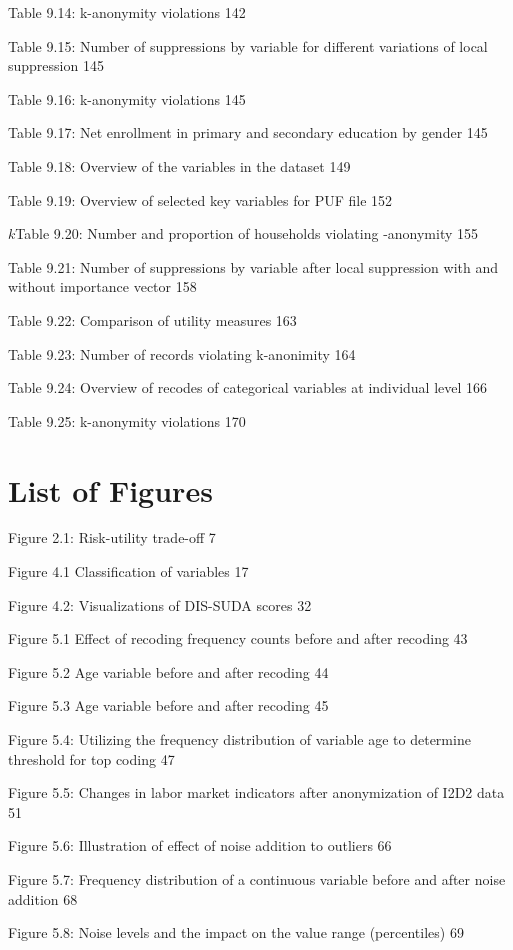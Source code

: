 \documentclass[letterpaper,10pt,english]{sphinxmanual}
\begin{document}
Table 9.14: k-anonymity violations 142

Table 9.15: Number of suppressions by variable for different variations
of local suppression 145

Table 9.16: k-anonymity violations 145

Table 9.17: Net enrollment in primary and secondary education by gender
145

Table 9.18: Overview of the variables in the dataset 149

Table 9.19: Overview of selected key variables for PUF file 152

\(k\)Table 9.20: Number and proportion of households violating
-anonymity 155

Table 9.21: Number of suppressions by variable after local suppression
with and without importance vector 158

Table 9.22: Comparison of utility measures 163

Table 9.23: Number of records violating k-anonimity 164

Table 9.24: Overview of recodes of categorical variables at individual
level 166

Table 9.25: k-anonymity violations 170


\section{List of Figures}
\label{\detokenize{lists:list-of-figures}}
Figure 2.1: Risk-utility trade-off 7

Figure 4.1 Classification of variables 17

Figure 4.2: Visualizations of DIS-SUDA scores 32

Figure 5.1 Effect of recoding \textendash{} frequency counts before and after
recoding 43

Figure 5.2 Age variable before and after recoding 44

Figure 5.3 Age variable before and after recoding 45

Figure 5.4: Utilizing the frequency distribution of variable age to
determine threshold for top coding 47

Figure 5.5: Changes in labor market indicators after anonymization of
I2D2 data 51

Figure 5.6: Illustration of effect of noise addition to outliers 66

Figure 5.7: Frequency distribution of a continuous variable before and
after noise addition 68

Figure 5.8: Noise levels and the impact on the value range (percentiles)
69
\end{document}
